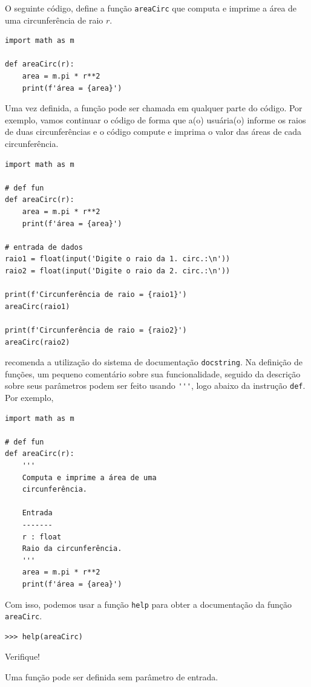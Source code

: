 \begin{ex}\label{cap_fun_sec_def:ex:areaCirc}
  O seguinte código, define a função \lstinline+areaCirc+ que computa e imprime a área de uma circunferência de raio $r$.
\begin{lstlisting}
import math as m

def areaCirc(r):
    area = m.pi * r**2
    print(f'área = {area}')
\end{lstlisting}
  Uma vez definida, a função pode ser chamada em qualquer parte do código. Por exemplo, vamos continuar o código de forma que a(o) usuária(o) informe os raios de duas circunferências e o código compute e imprima o valor das áreas de cada circunferência.
\begin{lstlisting}
import math as m

# def fun
def areaCirc(r):
    area = m.pi * r**2
    print(f'área = {area}')
    
# entrada de dados
raio1 = float(input('Digite o raio da 1. circ.:\n'))
raio2 = float(input('Digite o raio da 2. circ.:\n'))

print(f'Circunferência de raio = {raio1}')
areaCirc(raio1)

print(f'Circunferência de raio = {raio2}')
areaCirc(raio2)
\end{lstlisting}
\end{ex}

\begin{obs}
  {\python} recomenda a utilização do sistema de documentação \lstinline+docstring+. Na definição de funções, um pequeno comentário sobre sua funcionalidade, seguido da descrição sobre seus parâmetros podem ser feito usando \lstinline+'''+, logo abaixo da instrução \lstinline+def+. Por exemplo,
\begin{lstlisting}
import math as m

# def fun
def areaCirc(r):
    '''
    Computa e imprime a área de uma
    circunferência.

    Entrada
    -------
    r : float
    Raio da circunferência.
    '''
    area = m.pi * r**2
    print(f'área = {area}')
\end{lstlisting}
  Com isso, podemos usar a função \lstinline+help+ para obter a documentação da função \lstinline+areaCirc+.
\begin{lstlisting}
>>> help(areaCirc)
\end{lstlisting}
  Verifique!
\end{obs}

Uma função pode ser definida sem parâmetro de entrada.


